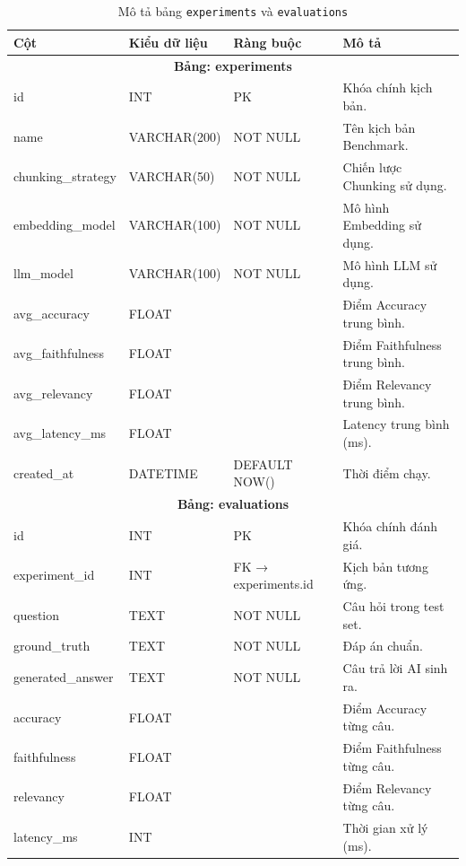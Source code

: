 \begin{table}[H]
  \centering
  \caption{Mô tả bảng \texttt{experiments} và \texttt{evaluations}}
  \label{tab:db-benchmark}
  \renewcommand{\arraystretch}{1.4}
  \begin{tabularx}{\textwidth}{|l|l|l|X|}
    \hline
    \rowcolor{blue!10}
    \textbf{Cột} & \textbf{Kiểu dữ liệu} & \textbf{Ràng buộc} & \textbf{Mô tả} \\
    \hline
    \multicolumn{4}{|c|}{\cellcolor{gray!20} \textbf{Bảng: experiments}} \\
    \hline
    id & INT & PK & Khóa chính kịch bản. \\
    name & VARCHAR(200) & NOT NULL & Tên kịch bản Benchmark. \\
    chunking\_strategy & VARCHAR(50) & NOT NULL & Chiến lược Chunking sử dụng. \\
    embedding\_model & VARCHAR(100) & NOT NULL & Mô hình Embedding sử dụng. \\
    llm\_model & VARCHAR(100) & NOT NULL & Mô hình LLM sử dụng. \\
    avg\_accuracy & FLOAT & & Điểm Accuracy trung bình. \\
    avg\_faithfulness & FLOAT & & Điểm Faithfulness trung bình. \\
    avg\_relevancy & FLOAT & & Điểm Relevancy trung bình. \\
    avg\_latency\_ms & FLOAT & & Latency trung bình (ms). \\
    created\_at & DATETIME & DEFAULT NOW() & Thời điểm chạy. \\
    \hline
    \multicolumn{4}{|c|}{\cellcolor{gray!20} \textbf{Bảng: evaluations}} \\
    \hline
    id & INT & PK & Khóa chính đánh giá. \\
    experiment\_id & INT & FK → experiments.id & Kịch bản tương ứng. \\
    question & TEXT & NOT NULL & Câu hỏi trong test set. \\
    ground\_truth & TEXT & NOT NULL & Đáp án chuẩn. \\
    generated\_answer & TEXT & NOT NULL & Câu trả lời AI sinh ra. \\
    accuracy & FLOAT & & Điểm Accuracy từng câu. \\
    faithfulness & FLOAT & & Điểm Faithfulness từng câu. \\
    relevancy & FLOAT & & Điểm Relevancy từng câu. \\
    latency\_ms & INT & & Thời gian xử lý (ms). \\
    \hline
  \end{tabularx}
\end{table}

